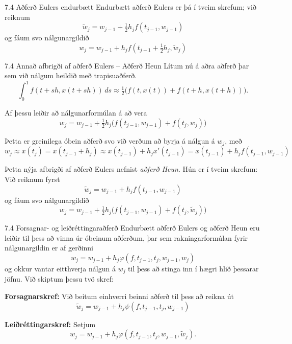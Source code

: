 \begin{frame}{7.4 Aðferð Eulers endurbætt} 
Endurbætt aðferð Eulers er þá í tveim skrefum; við
reiknum 
\begin{equation*}
  \tilde w_j = w_{j-1} + \tfrac 12 h_j f(t_{j-1},w_{j-1})
\end{equation*}
og fáum svo nálgunargildið
\begin{equation*}
  w_j = w_{j-1} + h_jf\left(
    t_{j-1}+\tfrac 12 h_j,\tilde w_j\right)
\end{equation*}
\end{frame}


\begin{frame}{7.4 Annað afbrigði af aðferð Eulers -- Aðferð Heun} 
Lítum nú á aðra aðferð þar sem við nálgum heildið með trapisuaðferð. 
$$
\int_0^1f(t+sh,x(t+sh))\, ds \approx 
\tfrac 12 \big(f(t,x(t))+f(t+h,x(t+h))\big). 
$$

\pause
\smallskip
Af þessu leiðir að nálgunarformúlan á að vera
$$
w_j=w_{j-1}+\tfrac 12h_j\big(f(t_{j-1},w_{j-1})+f(t_j,w_j)\big)
$$

\pause
Þetta er greinilega óbein aðferð svo við verðum að byrja á 
nálgun á $w_j$, með
$$
w_j\approx x(t_j)=x(t_{j-1}+h_j)\approx x(t_{j-1})+h_jx'(t_{j-1})
=x(t_{j-1})+h_jf(t_{j-1},w_{j-1}) 
$$

\smallskip
Þetta nýja afbrigði af aðferð Eulers nefnist {\it aðferð Heun}.
Hún er í tveim skrefum:  Við reiknum fyrst
\begin{equation*}
  \tilde w_j = w_{j-1} + h_jf(t_{j-1},w_{j-1})
\end{equation*}
og fáum svo nálgunargildið
\begin{equation*}
  w_j = w_{j-1} + \tfrac 12h_j
\big(f(t_{j-1},w_{j-1})+f(t_j,\tilde w_j)\big)
\end{equation*}
\end{frame}


\begin{frame}{7.4 Forsagnar- og leiðréttingaraðferð} 
Endurbætt aðferð  Eulers og  aðferð Heun eru leiðir til þess að vinna
úr óbeinum aðferðum, þar sem rakningarformúlan fyrir nálgunargildin er
af gerðinni
$$
w_j=w_{j-1}+h_j\varphi(f,t_{j-1},t_j,w_{j-1},w_j)
$$
og okkur vantar eitthverja nálgun á $w_j$ til þess að stinga inn í
hægri hlið þessarar jöfnu.  Við skiptum þessu tvö skref:

\pause
\smallskip
{\bf Forsagnarskref:}   Við beitum einhverri beinni aðferð til þess að
reikna út 
$$
\tilde w_j=w_{j-1}+h_j\psi(f,t_{j-1},t_j,w_{j-1})
$$

\pause
\smallskip
{\bf Leiðréttingarskref:} Setjum
$$
w_j=w_{j-1}+h_j\varphi(f,t_{j-1},t_j,w_{j-1},\tilde w_j).
$$
\end{frame}


